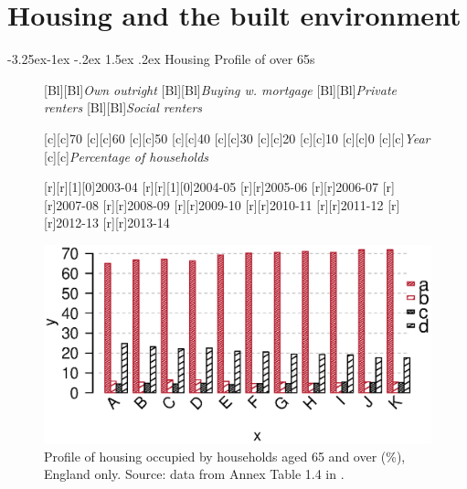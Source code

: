 \documentclass[11 pt, a4paper]{report}
\makeatletter
\renewcommand\section{\@startsection {section}{1}{\z@}%
                                   {-3.5ex \@plus -1ex \@minus -.2ex}%
                                   {2.3ex \@plus.2ex}%
                                   {\Large\itshape}}
\renewcommand\subsection{\@startsection{subsection}{2}{\z@}%
                                     {-3.25ex\@plus -1ex \@minus -.2ex}%
                                     {1.5ex \@plus .2ex}%
    								{\large\scshape}}
\makeatother
\begin{document}
\chapter{Housing and the built environment} %
\subsection{Housing Profile of over 65s}

\begin{figure}[hbtp!]
[Bl][Bl]{\small\emph{Own outright}}
[Bl][Bl]{\small\emph{Buying w. mortgage}}
[Bl][Bl]{\small\emph{Private renters}}
[Bl][Bl]{\small\emph{Social renters}}


[c][c]{\small{70}}
[c][c]{\small{60}}
[c][c]{\small{50}}
[c][c]{\small{40}}
[c][c]{\small{30}}
[c][c]{\small{20}}
[c][c]{\small{10}}
[c][c]{\small{0}}
[c][c]{\small{\emph{Year}}}
[c][c]{\small{\emph{Percentage of households}}}

[r][r][1][0]{\small{2003-04}}
[r][r][1][0]{\small{2004-05}}
[r][r]{\small{2005-06}}
[r][r]{\small{2006-07}}
[r][r]{\small{2007-08}}
[r][r]{\small{2008-09}}
[r][r]{\small{2009-10}}
[r][r]{\small{2010-11}}
[r][r]{\small{2011-12}}
[r][r]{\small{2012-13}}
[r][r]{\small{2013-14}}

\includegraphics[width=\textwidth]{../figures/Fig6.1.eps}
\caption{Profile of housing occupied by households aged 65 and over (\%), England only. Source: data from Annex Table 1.4 in  \citet{DCLG2015}.}\label{Fig:16} %
\end{figure}
\end{document}
